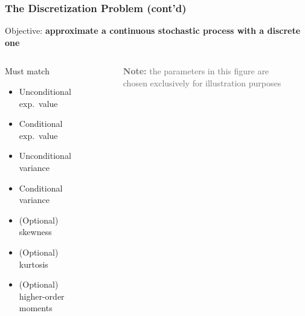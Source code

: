 \documentclass[10pt, aspectratio=1610, handout]{beamer}
\newcommand{\dimmer}[1]{\textcolor{dimgray}{#1}}
\begin{document}
 \begin{frame}
    \frametitle{The Discretization Problem (cont'd)}

    Objective: \textbf{approximate a continuous stochastic process with a discrete one}

    \vfill

    \begin{columns}
      \begin{column}{0.35\textwidth}
        Must match
        \begin{itemize}
          \item Unconditional exp.~value
          \item Conditional exp.~value
          \item Unconditional variance
          \item Conditional variance
          \item (Optional) skewness
          \item (Optional) kurtosis
          \item (Optional) higher-order moments
        \end{itemize}
      \end{column}
      \begin{column}{0.6\textwidth}
        \begin{figure}
          \centering

          {\scriptsize\dimmer{\textbf{Note:} the parameters in this figure are chosen exclusively for illustration purposes}}
        \end{figure}
      \end{column}
    \end{columns}

  \end{frame}
\end{document}
